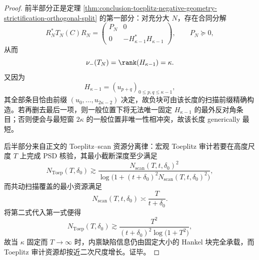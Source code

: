 \begin{proof}
前半部分正是定理 \ref{thm:conclusion-toeplitz-negative-geometry-strictification-orthogonal-split} 的第一部分：对充分大 \(N\)，存在合同分解
\[
R_N^\ast T_N(C)R_N=
\begin{pmatrix}
P_N&0\\
0&-H_{\kappa-1}^\ast H_{\kappa-1}
\end{pmatrix},
\qquad
P_N\succeq0,
\]
从而
\[
\nu_-(T_N)=\rank(H_{\kappa-1})=\kappa.
\]
又因为
\[
H_{\kappa-1}=(u_{p+q})_{0\le p,q\le \kappa-1},
\]
其全部条目恰由前缀 \((u_0,\dots,u_{2\kappa-2})\) 决定，故负块可由该长度的扫描前缀精确构造。若再删去最后一项，则一般位置下将无法唯一固定 \(H_{\kappa-1}\) 的最外反对角条目；否则便会与最短窗 \(2\kappa\) 的一般位置非唯一性相冲突，故该长度 generically 最短。

后半部分来自正文的 Toeplitz--scan 资源分离律：宏观 Toeplitz 审计若要在高度尺度 \(T\) 上完成 PSD 核验，其最小截断深度至少满足
\[
N_{\mathrm{Toep}}(T,\delta_0)\gtrsim
\frac{N_{\mathrm{scan}}(T,t,\delta_0)^2}
{\log\!\bigl(1+(t+\delta_0)^2N_{\mathrm{scan}}(T,t,\delta_0)^2\bigr)},
\]
而共动扫描覆盖的最小资源满足
\[
N_{\mathrm{scan}}(T,t,\delta_0)\asymp \frac{T}{t+\delta_0}.
\]
将第二式代入第一式便得
\[
N_{\mathrm{Toep}}(T,\delta_0)\gtrsim
\frac{T^2}{(t+\delta_0)^2\log\!\bigl(1+T^2\bigr)},
\]
故当 \(\kappa\) 固定而 \(T\to\infty\) 时，内禀缺陷信息仍由固定大小的 Hankel 块完全承载，而 Toeplitz 审计资源却按近二次尺度增长。证毕。
\end{proof}

